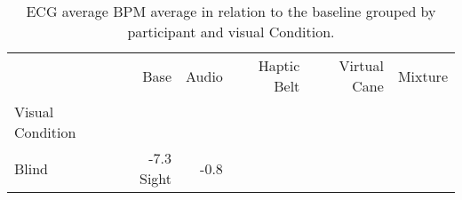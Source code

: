 
\begin{table}[!htb]
\centering
\caption{ECG average BPM average in relation to the baseline grouped by participant and visual Condition.}
\label{tab:ecg_bpm_average_group}
\begin{tabular}{lrrrrr}
\toprule
{} &   Base &   Audio & Haptic Belt & Virtual Cane & Mixture \\
Visual Condition &        &         &             &              &         \\
\midrule
Blind            &  -7.3%
Sight            &  -0.8%
\bottomrule
\end{tabular}
\end{table}

